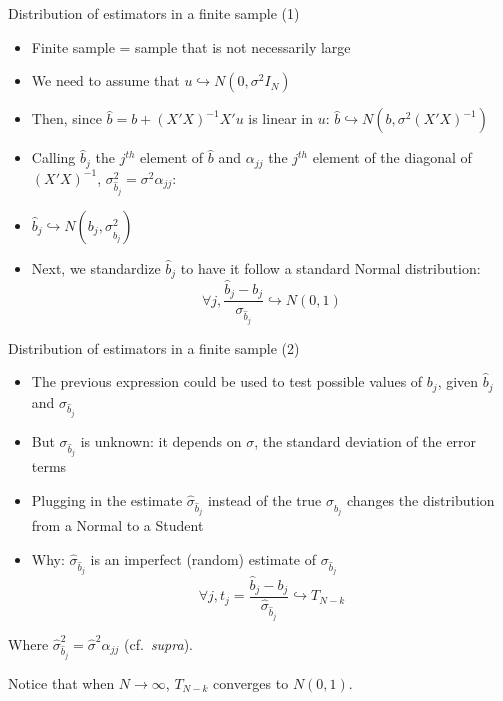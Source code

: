 \documentclass[aspectratio=169]{beamer}
\begin{document}
\begin{frame}{Distribution of estimators in a finite sample (1)}
\begin{itemize}
    \item Finite sample = sample that is not necessarily large
    \item We need to assume that $u \hookrightarrow N(0,\sigma^2I_N)$
    \item Then, since $\hat{b} = b + (X'X)^{-1}X'u$ is linear in $u$: $\hat{b} \hookrightarrow N(b, \sigma^2(X'X)^{-1})$
    \item Calling $\hat{b}_j$ the $j^{th}$ element of $\hat{b}$ and $\alpha_{jj}$ the $j^{th}$ element of the diagonal of $(X'X)^{-1}$, $\sigma_{\hat{b}_j}^2 = \sigma^2\alpha_{jj}$:
    \item $\hat{b}_j \hookrightarrow N(b_j, \sigma_{\hat{b}_j}^2)$
    \item Next, we standardize $\hat{b}_j$ to have it follow a standard Normal distribution:
    \[
    \forall j, \frac{\hat{b}_j - b_j}{\sigma_{\hat{b}_j}} \hookrightarrow N(0,1)
    \]
\end{itemize}
\end{frame}

\begin{frame}{Distribution of estimators in a finite sample (2)}
\begin{itemize}
    \item The previous expression could be used to test possible values of $b_j$, given $\hat{b}_j$ and $\sigma_{\hat{b}_j}$
    \item But $\sigma_{\hat{b}_j}$ is unknown: it depends on $\sigma$, the standard deviation of the error terms
    \item Plugging in the estimate $\hat{\sigma}_{\hat{b}_j}$ instead of the true $\sigma_{\hat{b}_j}$ changes the distribution from a Normal to a Student
    \item Why: $\hat{\sigma}_{\hat{b}_j}$ is an imperfect (random) estimate of $\sigma_{\hat{b}_j}$
    \[
    \forall j, t_j = \frac{\hat{b}_j - b_j}{\hat{\sigma}_{\hat{b}_j}} \hookrightarrow T_{N-k}
    \]
\end{itemize}

Where $\hat{\sigma}_{\hat{b}_j}^2 = \hat{\sigma}^2\alpha_{jj}$ (cf.\ \textit{supra}).

Notice that when $N \to \infty$, $T_{N-k}$ converges to $N(0,1)$.
\end{frame}
\end{document}
